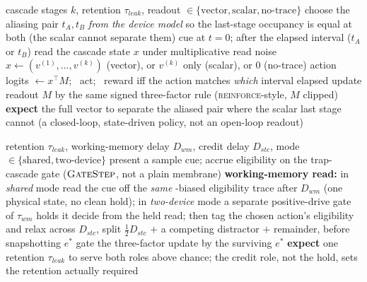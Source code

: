 \begin{algorithm}[htbp!]
\caption{Vector-timer cascade readout (Figure~\ref{fig:8d}).}
\label{alg:vectortimer}
\begin{algorithmic}[1]
\Require cascade stages $k$, retention $\tau_{leak}$, readout $\in\{\text{vector},\text{scalar},\text{no-trace}\}$
\State choose the aliasing pair $t_A, t_B$ \emph{from the device model} so the last-stage occupancy is equal at both (the scalar cannot separate them)
    \State cue at $t=0$; after the elapsed interval ($t_A$ or $t_B$) read the cascade state $x$ under multiplicative read noise
    \State $x \gets (v^{(1)},\dots,v^{(k)})$ (vector), or $v^{(k)}$ only (scalar), or $0$ (no-trace)
    \State action logits $\gets x^{\!\top}M$; \ act; \ reward iff the action matches \emph{which} interval elapsed
    \State update readout $M$ by the same signed three-factor rule (\textsc{reinforce}-style, $M$ clipped)
\EndFor
\State \textbf{expect} the full vector to separate the aliased pair where the scalar last stage cannot (a closed-loop, state-driven policy, not an open-loop readout)
\end{algorithmic}
\end{algorithm}

\begin{algorithm}[htbp!]
\caption{One device serving working memory and eligibility (Figure~\ref{fig:8g}).}
\label{alg:wmstc}
\begin{algorithmic}[1]
\Require retention $\tau_{leak}$, working-memory delay $D_{wm}$, credit delay $D_{stc}$, mode $\in\{\text{shared},\text{two-device}\}$
    \State present a sample cue; accrue eligibility on the trap-cascade gate ($\textsc{GateStep}$, not a plain membrane)
    \State \textbf{working-memory read:} in \emph{shared} mode read the cue off the \emph{same} -biased eligibility trace after $D_{wm}$ (one physical state, no clean hold); in \emph{two-device} mode a separate positive-drive gate of $\tau_{wm}$ holds it
    \State decide from the held read; then tag the chosen action's eligibility and relax across $D_{stc}$, split $\tfrac{1}{2}D_{stc}$ $+$ a competing distractor $+$ remainder, before snapshotting $e^{\ast}$
    \State gate the three-factor update by the surviving $e^{\ast}$
\EndFor
\State \textbf{expect} one retention $\tau_{leak}$ to serve both roles above chance; the credit role, not the hold, sets the retention actually required
\end{algorithmic}
\end{algorithm}

